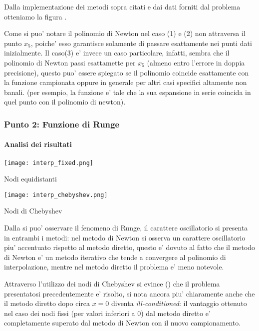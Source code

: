 Dalla implementazione dei metodi sopra citati e dai dati forniti dal problema
otteniamo la figura .

Come si puo' notare il polinomio di Newton nel caso (1) e (2) non attraversa il punto $x_5$, poiche' esso garantisce solamente di passare esattamente nei punti
dati inizialmente. Il caso(3) e' invece un caso particolare, infatti, sembra che il polinomio di Newton passi esattamette per $x_5$ (almeno entro l'errore in doppia precisione), questo puo' essere spiegato se il polinomio coincide
esattamente con la funzione campionata oppure in generale per altri casi specifici
altamente non banali. (per esempio, la funzione e' tale che la sua espansione in serie coincida in quel
punto con il polinomio di newton).

\subsubsection{Punto 2: Funzione di Runge}

\paragraph{Analisi dei risultati}

\begin{marginfigure}
	\texttt{[image: interp\_fixed.png]}
	\caption{Nodi equidistanti}
	\label{fig:runge_fixed}
\end{marginfigure}

\begin{marginfigure}
	\texttt{[image: interp\_chebyshev.png]}
	\caption{Nodi di Chebyshev}
	\label{fig:runge_chebyshev}
\end{marginfigure}

Dalla  si puo' osservare il fenomeno di Runge, il
carattere oscillatorio si presenta in entrambi i metodi: nel metodo di Newton si
osserva un carattere oscillatorio piu' accentuato rispetto al metodo diretto, questo e' dovuto al fatto che il metodo di Newton e' un metodo iterativo che tende a convergere al polinomio di interpolazione, mentre nel metodo diretto il problema
e' meno notevole. %

Attraverso l'utilizzo dei nodi di Chebyshev si evince () che il problema presentatosi precedentemente e' risolto, si nota ancora piu' chiaramente anche che il metodo diretto dopo circa $x=0$ diventa \textit{ill-conditioned}: il vantaggio ottenuto nel caso dei nodi fissi (per valori inferiori a 0) dal metodo diretto
e' completamente superato dal metodo di Newton con il nuovo campionamento.

